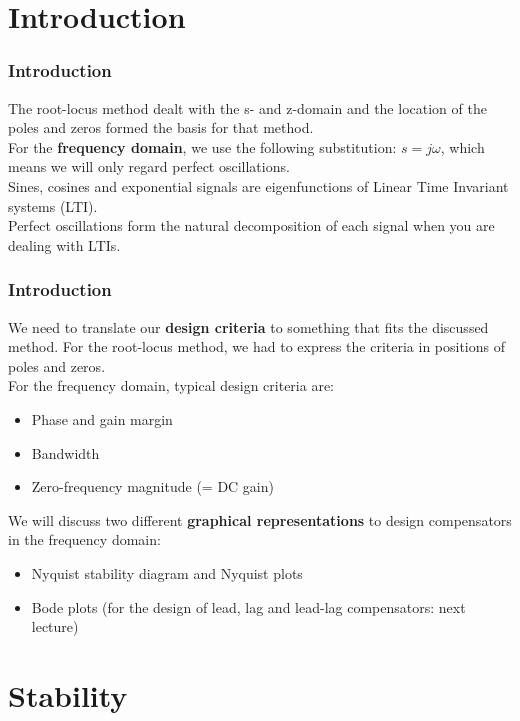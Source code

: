 \section{Introduction}

\begin{frame}
	\frametitle{Introduction}
	\vspace{-10ex}
	The root-locus method dealt with the s- and z-domain and the location of the poles and zeros formed the basis for that method.\\
	\medskip
	For the \textbf{frequency domain}, we use the following substitution: $s=j\omega$, which means we will only regard perfect oscillations.\\
	\medskip
	Sines, cosines and exponential signals are eigenfunctions of Linear Time Invariant systems (LTI).\\
	Perfect oscillations form the natural decomposition of each signal when you are dealing with LTIs.
\end{frame}

\begin{frame}
	\frametitle{Introduction}
	We need to translate our \textbf{design criteria} to something that fits the discussed method. For the root-locus method, we had to express the criteria in positions of poles and zeros.\\
	For the frequency domain, typical design criteria are:
	\begin{itemize}
		\item Phase and gain margin
		\item Bandwidth
		\item Zero-frequency magnitude (= DC gain)
	\end{itemize}
	\bigskip
	We will discuss two different \textbf{graphical representations} to design compensators in the frequency domain:
	\begin{itemize}
		\item Nyquist stability diagram and Nyquist plots
		\item Bode plots (for the design of lead, lag and lead-lag compensators: next lecture)
	\end{itemize}
\end{frame}

\section{Stability}

